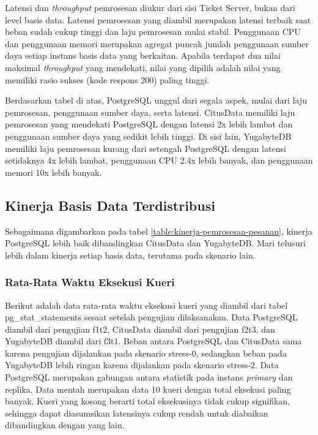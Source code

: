 Latensi dan \textit{throughput} pemrosesan diukur dari sisi Ticket Server, bukan dari level basis data. Latensi pemrosesan yang diambil merupakan latensi terbaik saat beban sudah cukup tinggi dan laju pemrosesan mulai stabil. Penggunaan CPU dan penggunaan memori merupakan agregat puncak jumlah penggunaan sumber daya setiap instans basis data yang berkaitan. Apabila terdapat dua nilai maksimal \textit{throughput} yang mendekati, nilai yang dipilih adalah nilai yang memiliki rasio sukses (kode respons 200) paling tinggi.

Berdasarkan tabel di atas, PostgreSQL unggul dari segala aspek, mulai dari laju pemrosesan, penggunaan sumber daya, serta latensi. CitusData memiliki laju pemrosesan yang mendekati PostgreSQL dengan latensi 2x lebih lambat dan penggunaan sumber daya yang sedikit lebih tinggi. Di sisi lain, YugabyteDB memiliki laju pemrosesan kurang dari setengah PostgreSQL dengan latensi setidaknya 4x lebih lambat, penggunaan CPU 2.4x lebih banyak, dan penggunaan memori 10x lebih banyak.

\subsection{Kinerja Basis Data Terdistribusi}

Sebagaimana digambarkan pada tabel \ref{table:kinerja-pemrosesan-pesanan}, kinerja PostgreSQL lebih baik dibandingkan CitusData dan YugabyteDB. Mari telusuri lebih dalam kinerja setiap basis data, terutama pada skenario lain.

\subsubsection{Rata-Rata Waktu Eksekusi Kueri}

Berikut adalah data rata-rata waktu eksekusi kueri yang diambil dari tabel pg\_stat\_statements sesaat setelah pengujian dilaksanakan. Data PostgreSQL diambil dari pengujian f1t2, CitusData diambil dari pengujian f2t3, dan YugabyteDB diambil dari f3t1. Beban antara PostgreSQL dan CitusData sama karena pengujian dijalankan pada skenario stress-0, sedangkan beban pada YugabyteDB lebih ringan karena dijalankan pada skenario stress-2. Data PostgreSQL merupakan gabungan antara statistik pada instans \textit{primary} dan replika. Data mentah merupakan data 10 kueri dengan total eksekusi paling banyak. Kueri yang kosong berarti total eksekusinya tidak cukup signifikan, sehingga dapat diasumsikan latensinya cukup rendah untuk diabaikan dibandingkan dengan yang lain.

